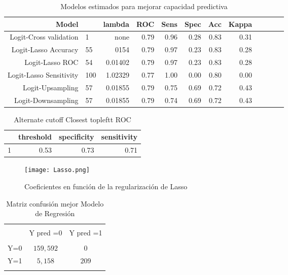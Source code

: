 \documentclass[11pt]{article}
\begin{document}
\begin{table}[ht]
\caption{Modelos estimados para mejorar capacidad predictiva} 
  \label{}
\centering
\begin{tabular}{rlrrrrrrrrrr}
  \hline
Model &  & lambda & ROC & Sens & Spec & Acc & Kappa \\ 
  \hline
Logit-Cross validation & 1 & none & 0.79 & 0.96 & 0.28 & 0.83 & 0.31  \\ 
Logit-Lasso Accuracy &  55 & 0154 & 0.79 & 0.97 & 0.23 & 0.83 & 0.28  \\ 
Logit-Lasso ROC & 54 & 0.01402 & 0.79 & 0.97 & 0.23 & 0.83 & 0.28  \\ 
Logit-Lasso Sensitivity & 100 & 1.02329 & 0.77 & 1.00 & 0.00 & 0.80 & 0.00 \\ 
Logit-Upsampling &  57 & 0.01855 & 0.79 & 0.75 & 0.69 & 0.72 & 0.43  \\ 
Logit-Downsampling &  57 & 0.01855 & 0.79 & 0.74 & 0.69 & 0.72 & 0.43 \\ 
   \hline
\end{tabular}
\end{table}

\begin{table}[ht]
\centering
\caption{Alternate cutoff Closest topleftt ROC}
\begin{tabular}{rrrr}
  \hline
 & threshold & specificity & sensitivity \\ 
  \hline
1 & 0.53 & 0.73 & 0.71 \\ 
   \hline
\end{tabular}
\end{table}


\begin{figure}[h]
\caption{Coeficientes en función de la regularización de Lasso}
\centering
\texttt{[image: Lasso.png]}

\end{figure}

\begin{table}[!htbp] \centering 
  \caption{Matriz confusión mejor Modelo de Regresión} 
  \label{} 
\begin{tabular}{@{\extracolsep{5pt}} ccc} 
\\[-1.8ex]\hline 
\hline \\[-1.8ex] 
 & Y pred =0 & Y pred =1 \\ 
\hline \\[-1.8ex] 
Y=0 & $159,592$ & 0 \\ 
Y=1& $5,158$ & $209$ \\ 
\hline \\[-1.8ex] 
\end{tabular} 
\end{table}
\end{document}
